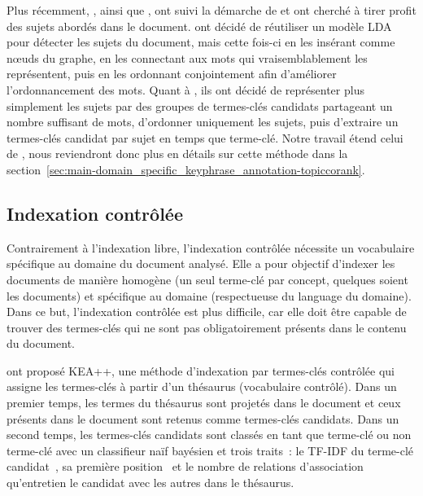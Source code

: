     Plus récemment, , ainsi que
    , ont suivi la démarche de
     et ont cherché à tirer profit des sujets
    abordés dans le document.  ont décidé
    de réutiliser un modèle LDA pour détecter les sujets du document, mais cette
    fois-ci en les insérant comme n\oe{}uds du graphe, en les connectant aux
    mots qui vraisemblablement les représentent, puis en les ordonnant
    conjointement afin d'améliorer l'ordonnancement des mots.
    Quant à , ils ont décidé de
    représenter plus simplement les sujets par des groupes de termes-clés
    candidats partageant un nombre suffisant de mots, d'ordonner uniquement les
    sujets, puis d'extraire un termes-clés candidat par sujet en temps que
    terme-clé. Notre travail étend celui de ,
    nous reviendront donc plus en détails sur cette méthode dans la
    section~\ref{sec:main-domain_specific_keyphrase_annotation-topiccorank}.

  \subsection{Indexation contrôlée}
  \label{subsec:main-domain_specific_keyphrase_annotation-state_of_the_art-keyphrase_extraction}
    Contrairement à l'indexation libre, l'indexation contrôlée nécessite un
    vocabulaire spécifique au domaine du document analysé. Elle a pour objectif
    d'indexer les documents de manière homogène (un seul terme-clé par concept,
    quelques soient les documents) et spécifique au domaine (respectueuse du
    language du domaine). Dans ce but,
    l'indexation contrôlée est plus difficile, car elle doit être capable de
    trouver des termes-clés qui ne sont pas obligatoirement présents dans le
    contenu du document.

     ont proposé KEA++, une méthode d'indexation par
    termes-clés contrôlée qui assigne les termes-clés à partir d'un thésaurus
    (vocabulaire contrôlé).
    Dans un premier temps, les termes du thésaurus sont projetés dans le
    document et ceux présents dans le document sont retenus comme termes-clés
    candidats. Dans un second temps, les termes-clés candidats sont classés en
    tant que \og{}terme-clé\fg{} ou \og{}non terme-clé\fg{} avec un classifieur
    naïf bayésien et trois traits~: le TF-IDF du terme-clé
    candidat~\cite{witten1999kea}, sa première position~\cite{witten1999kea} et
    le nombre de relations d'association qu'entretien le candidat avec les
    autres dans le thésaurus.

